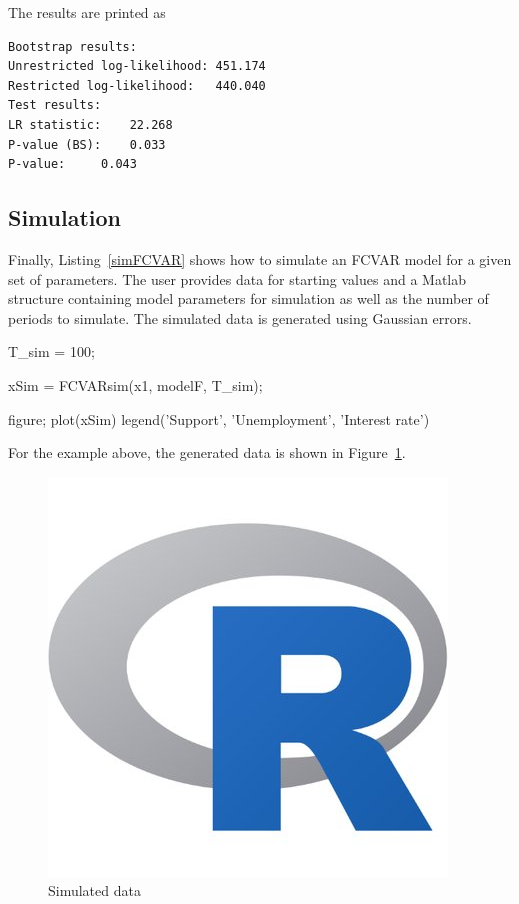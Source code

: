 \documentclass[article]{jss}
\begin{document}
The results are printed as
\begin{verbatim}
Bootstrap results:
Unrestricted log-likelihood: 451.174
Restricted log-likelihood:   440.040
Test results:
LR statistic: 	 22.268
P-value (BS): 	 0.033
P-value: 	 0.043
\end{verbatim}

\subsection{Simulation}
\label{sec:simulation}

Finally, Listing~\ref{simFCVAR} shows how to simulate an FCVAR model for a given set of parameters. The user provides data for starting values and a Matlab structure containing model parameters for simulation as well as the number of periods to simulate. The simulated data is generated using Gaussian errors.

\begin{Code}


T_sim = 100;

xSim = FCVARsim(x1, modelF, T_sim);

figure;
plot(xSim)
legend('Support', 'Unemployment', 'Interest rate')
\end{Code}

For the example above, the generated data is shown in Figure~\ref{fig:sim}.

\begin{figure}[tbh]
  \centering
  \caption{Simulated data}
  \label{fig:sim}
  \includegraphics[scale = 1, keepaspectratio=true]{Figures/sim.png}
\end{figure}
\end{document}
